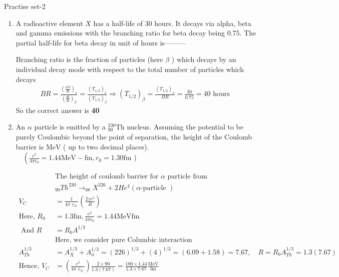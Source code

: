\newpage
\begin{abox}
	Practise set-2
\end{abox}
\begin{enumerate}
	\item A radioactive element $X$ has a half-life of 30 hours. It decays via alpha, beta and gamma emissions with the branching ratio for beta decay being $0.75$. The partial half-life for beta decay in unit of hours is---------
	{}
	\begin{answer}
		Branching ratio is the fraction of particles (here $\beta$ ) which decays by an individual decay mode with respect to the total number of particles which decays
		\begin{align*}
		B R=\frac{\left(\frac{d N}{d t}\right)_x}{\left(\frac{d t}{d t}\right)_\beta}=\frac{\left(T_{1 / 2}\right)_x}{\left(T_{1 / 2}\right)_\beta} \Rightarrow\left(T_{1 / 2}\right)_\beta=\frac{\left(T_{1 / 2}\right)_x}{B R}=\frac{30}{0.75}=40 \text { hours }
		\end{align*}
		So the correct answer is \textbf{40}
	\end{answer}
	\item An $\alpha$ particle is emitted by a ${ }_{90}^{230} \mathrm{Th}$ nucleus. Assuming the potential to be purely Coulombic beyond the point of separation, the height of the Coulomb barrier is
	$\mathrm{MeV}$ ( up to two decimal places). $\quad\left(\frac{e^2}{4 \pi \epsilon_0}=1.44 \mathrm{MeV}-\mathrm{fm}, r_0=1.30 \mathrm{fm}\right.$ )
	{}
	\begin{answer}
		\begin{align*}
		&\text{The height of coulomb barrier for $\alpha$ particle from}\\
		&{ }_{90} T h^{230} \rightarrow_{88} X^{226}+2 H e^4(\alpha \text {-particle }) \\
		V_C&=\frac{1}{4 \pi \in_0}\left(\frac{2 z e^2}{R}\right)\\
		\text{Here, }R_0&=1.3 \mathrm{fm}, \frac{e^2}{4 \pi \epsilon_0}=1.44 \mathrm{MeV} \mathrm{fm}\\
		\text{	And }R&=R_0 A^{1 / 3}\\
		&\text{Here, we consider pure Columbic interaction}\\
		A_{T h}^{1 / 3}&=A_X^{1 / 3}+A_\alpha^{1 / 3}=(226)^{1 / 3}+(4)^{1 / 3}=(6.09+1.58)=7.67, \quad R=R_0 A_{T h}^{1 / 3}=1.3(7.67)\\
		\text{Hence, }V_C&=\left(\frac{e^2}{4 \pi \in_0}\right) \frac{2 \times 90}{1.3(7.67)}=\frac{180 \times 1.44}{1.3 \times 7.67} \frac{\mathrm{MeV}}{\mathrm{fm}}\\

\end{align*}
\end{answer}
\end{enumerate}
